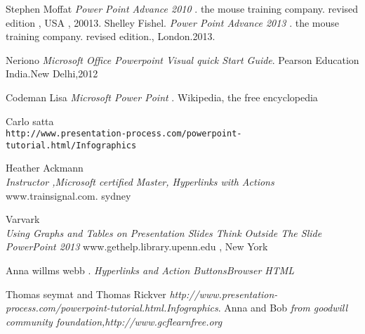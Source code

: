 \documentclass{raitdisser}
\begin{document}
\begin{thebibliography}{9}
Stephen Moffat
\textit{Power Point Advance 2010 }.
the mouse training company. revised edition , USA , 20013.
Shelley Fishel.
\textit{Power Point Advance 2013 }.
the mouse training company. revised edition., London.2013.

Neriono
\textit{Microsoft Office Powerpoint Visual quick Start Guide}.
Pearson Education India.New Delhi,2012



Codeman Lisa
\textit{Microsoft Power Point }.
Wikipedia, the free encyclopedia

 Carlo satta
 \\\texttt{http://www.presentation-process.com/powerpoint-tutorial.html/Infographics}

Heather Ackmann
\\\textit {Instructor ,Microsoft certified Master, Hyperlinks with Actions}
www.trainsignal.com. sydney

Varvark
\\\textit {Using Graphs and Tables on Presentation Slides Think Outside The Slide PowerPoint 2013 }
www.gethelp.library.upenn.edu , New York

Anna willms webb
\textit{}.
\textit{Hyperlinks and Action ButtonsBrowser HTML }


Thomas seymat and Thomas Rickver
\textit{http://www.presentation-process.com/powerpoint-tutorial.html.Infographics}.
Anna and Bob
\textit{from goodwill community foundation,http://www.gcflearnfree.org}

\end{thebibliography}
%
\end{document}
